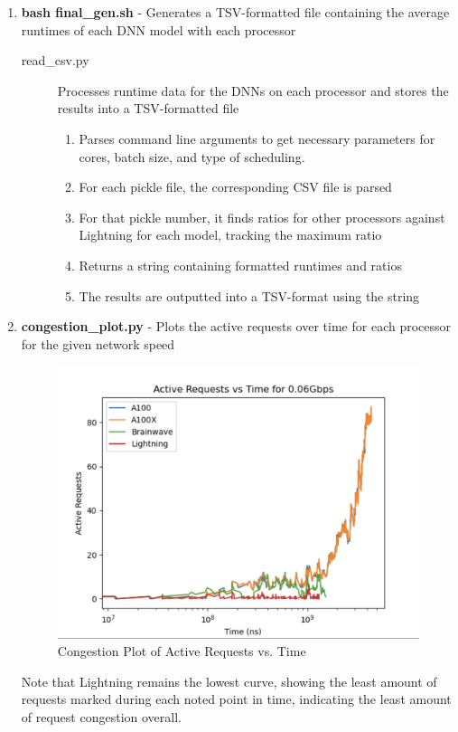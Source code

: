 \documentclass[11pt]{article}
\begin{document}
\begin{enumerate}
    \item \textbf{bash final\_gen.sh} - Generates a TSV-formatted file containing the average runtimes of each DNN model with each processor
    \begin{description}
        \item[read\_csv.py] Processes runtime data for the DNNs on each processor and stores the results into a TSV-formatted file
        \begin{enumerate}
            \item Parses command line arguments to get necessary parameters for cores, batch size, and type of scheduling.
            \item For each pickle file, the corresponding CSV file is parsed
            \item For that pickle number, it finds ratios for other processors against Lightning for each model, tracking the maximum ratio
            \item Returns a string containing formatted runtimes and ratios
            \item The results are outputted into a TSV-format using the string 
        \end{enumerate}
    \end{description}

    \item \textbf{congestion\_plot.py} - Plots the active requests over time for each processor for the given network speed

    \begin{figure}[H]
    \centering
    \includegraphics[scale=.75]{congestion.png}
    \caption{Congestion Plot of Active Requests vs. Time}
    \label{fig:enter-label}
\end{figure}

    Note that Lightning remains the lowest curve, showing the least amount of requests marked during each noted point in time, indicating the least amount of request congestion overall.

\end{enumerate}
\end{document}
